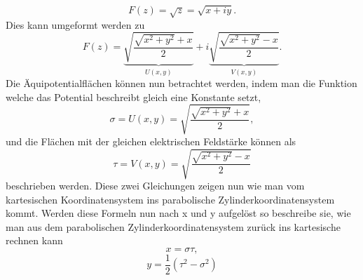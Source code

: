 \begin{equation}
	F(z) 
	= 
	\sqrt{z} 
	= 
	\sqrt{x + iy}.
\end{equation}
Dies kann umgeformt werden zu
\begin{equation}
	F(z) 
	= 
	\underbrace{\sqrt{\frac{\sqrt{x^2+y^2} + x}{2}}}_{U(x,y)} 
	+ 
	i\underbrace{\sqrt{\frac{\sqrt{x^2+y^2} - x}{2}}}_{V(x,y)}
	.
\end{equation}
Die Äquipotentialflächen können nun betrachtet werden, indem man die Funktion welche das Potential beschreibt gleich eine Konstante setzt,
\begin{equation}
	\sigma = U(x,y) = \sqrt{\frac{\sqrt{x^2+y^2} + x}{2}},
\end{equation}
und die Flächen mit der gleichen elektrischen Feldstärke können als
\begin{equation}
	\tau = V(x,y) = \sqrt{\frac{\sqrt{x^2+y^2} - x}{2}}
\end{equation}
beschrieben werden. Diese zwei Gleichungen zeigen nun wie man vom kartesischen Koordinatensystem ins parabolische Zylinderkoordinatensystem kommt. Werden diese Formeln nun nach x und y aufgelöst so beschreibe sie, wie man aus dem parabolischen Zylinderkoordinatensystem zurück ins kartesische rechnen kann
\begin{equation}
	x = \sigma \tau,
\end{equation}
\begin{equation}
	y = \frac{1}{2}\left ( \tau^2 - \sigma^2 \right )
\end{equation}






